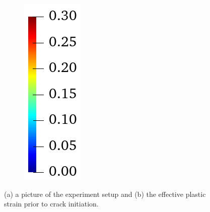 \begin{figure}[!htb]
\begin{subfigure}[b]{0.06\textwidth}
    \includegraphics[width=\textwidth,scale=0.5]{Chapter5/figures/3pb/colorbar_ep}
    \vspace{1em}
  \end{subfigure}
  \label{fig: Chapter5/3pb/plastic_strain}
  \caption{(a) a picture of the experiment setup \cite{kubik2019ductile} and (b) the effective plastic strain prior to crack initiation.
  }
\end{figure}
